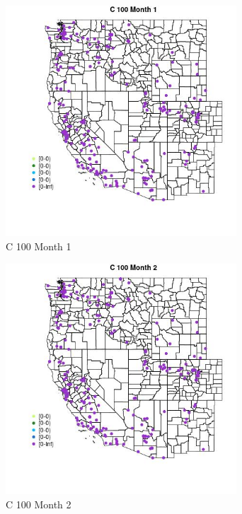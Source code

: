 \begin{figure} 
\centering  
\includegraphics[width=0.77\textwidth]{Code_Outputs/Report_ML_input_PM25_Step4_part_e_de_duplicated_aveswNAs_MapObsMo1C_100.jpg} 
\caption{\label{fig:Report_ML_input_PM25_Step4_part_e_de_duplicated_aveswNAsMapObsMo1C_100}C 100 Month 1} 
\end{figure} 
 

\begin{figure} 
\centering  
\includegraphics[width=0.77\textwidth]{Code_Outputs/Report_ML_input_PM25_Step4_part_e_de_duplicated_aveswNAs_MapObsMo2C_100.jpg} 
\caption{\label{fig:Report_ML_input_PM25_Step4_part_e_de_duplicated_aveswNAsMapObsMo2C_100}C 100 Month 2} 
\end{figure} 
 

